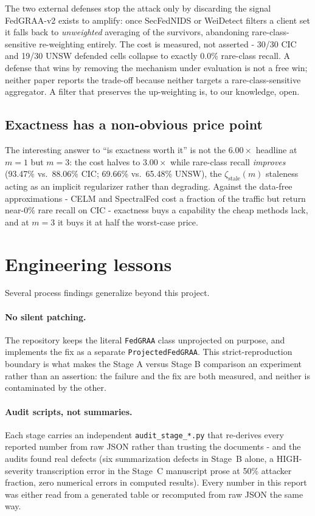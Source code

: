 \documentclass[11pt,a4paper]{report}
\begin{document}
The two external defenses stop the
attack only by discarding the signal FedGRAA-v2 exists to amplify: once
SecFedNIDS or WeiDetect filters a client set it falls back to
\emph{unweighted} averaging of the survivors, abandoning rare-class-sensitive
re-weighting entirely. The cost is measured, not asserted - 30/30 CIC and
19/30 UNSW defended cells collapse to exactly 0.0\% rare-class recall. A
defense that wins by removing the mechanism under evaluation is not a free
win; neither paper reports the trade-off because neither targets a
rare-class-sensitive aggregator. A filter that preserves the up-weighting
is, to our knowledge, open.

\subsection{Exactness has a non-obvious price point}

The interesting answer
to ``is exactness worth it'' is not the $6.00\times$ headline at $m = 1$ but
$m = 3$: the cost halves to $3.00\times$ while rare-class recall
\emph{improves} (93.47\% vs.\ 88.06\% CIC; 69.66\% vs.\ 65.48\% UNSW), the
$\zeta_{\mathrm{stale}}(m)$ staleness acting as an implicit regularizer
rather than degrading. Against the data-free approximations - CELM and
SpectralFed cost a fraction of the traffic but return near-0\% rare recall
on CIC - exactness buys a capability the cheap methods lack, and at $m = 3$
it buys it at half the worst-case price.

\section{Engineering lessons}
\label{sec:lessons}

Several process findings generalize beyond this project.

\paragraph{No silent patching.} The repository keeps the literal
\texttt{FedGRAA} class unprojected on purpose, and implements the fix as a
separate \texttt{ProjectedFedGRAA}. This strict-reproduction boundary is
what makes the Stage A versus Stage B comparison an experiment rather than
an assertion: the failure and the fix are both measured, and neither is
contaminated by the other.

\paragraph{Audit scripts, not summaries.} Each stage carries an independent
\texttt{audit\_stage\_*.py} that re-derives every reported number from raw
JSON rather than trusting the documents - and the audits found real defects
(six summarization defects in Stage~B alone, a HIGH-severity transcription
error in the Stage~C manuscript prose at 50\% attacker fraction, zero
numerical errors in computed results). Every number in this report was
either read from a generated table or recomputed from raw JSON the same
way.
\end{document}
